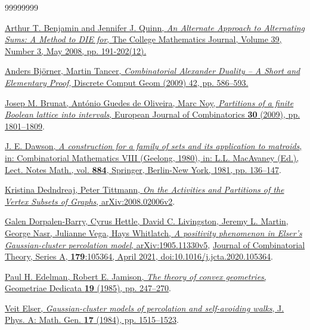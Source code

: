 \documentclass[numbers=enddot,12pt,final,onecolumn]{scrartcl}%
\theoremstyle{definition}
\begin{document}
\begin{thebibliography}{99999999}                                                                                         %


%
\href{https://scholarship.claremont.edu/cgi/viewcontent.cgi?referer=&httpsredir=1&article=1581&context=hmc_fac_pub}{Arthur
T. Benjamin and Jennifer J. Quinn, \textit{An Alternate Approach to
Alternating Sums: A Method to DIE for}, The College Mathematics Journal,
Volume 39, Number 3, May 2008, pp. 191-202(12).}

%
\href{https://doi.org/10.1007/s00454-008-9102-x}{Anders Bj\"{o}rner, Martin
Tancer, \textit{Combinatorial Alexander Duality -- A Short and Elementary
Proof}, Discrete Comput Geom (2009) 42, pp. 586--593.}

%
\href{https://doi.org/10.1016/j.ejc.2008.12.010}{Josep M. Brunat, Ant\'{o}nio
Guedes de Oliveira, Marc Noy, \textit{Partitions of a finite Boolean lattice
into intervals}, European Journal of Combinatorics \textbf{30} (2009), pp.
1801--1809}.

\href{https://doi.org/10.1007/BFb0091815}{J. E.
Dawson, \textit{A construction for a family of sets and its application to
matroids}, in: Combinatorial Mathematics VIII (Geelong, 1980), in: L.L.
MacAvaney (Ed.), Lect. Notes Math., vol. \textbf{884}, Springer, Berlin-New
York, 1981, pp. 136--147}.

\href{https://arxiv.org/abs/2008.02006v2}{Kristina
Dedndreaj, Peter Tittmann, \textit{On the Activities and Partitions of the
Vertex Subsets of Graphs}, arXiv:2008.02006v2}.

\href{https://arxiv.org/abs/1905.11330v5}{Galen
Dorpalen-Barry, Cyrus Hettle, David C. Livingston, Jeremy L. Martin, George
Nasr, Julianne Vega, Hays Whitlatch, \textit{A positivity phenomenon in
Elser's Gaussian-cluster percolation model}, arXiv:1905.11330v5},
\href{https://doi.org/10.1016/j.jcta.2020.105364}{Journal of Combinatorial
Theory, Series A, \textbf{179}:105364, April 2021,
doi:10.1016/j.jcta.2020.105364}.

\href{https://doi.org/10.1007/BF00149365}{Paul H.
Edelman, Robert E. Jamison, \textit{The theory of convex geometries},
Geometriae Dedicata \textbf{19} (1985), pp. 247--270}.

%
\href{https://iopscience.iop.org/article/10.1088/0305-4470/17/7/019/pdf}{Veit
Elser, \textit{Gaussian-cluster models of percolation and self-avoiding
walks}, J. Phys. A: Math. Gen. \textbf{17} (1984), pp. 1515--1523}.


\end{thebibliography}
\end{document}
